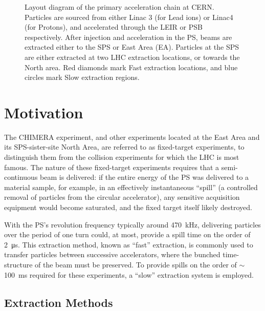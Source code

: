 \documentclass[11pt]{report}
\begin{document}
\begin{figure}
\caption{Layout diagram of the primary acceleration chain at CERN. Particles are sourced from either Linac 3 (for Lead ions) or Linac4 (for Protons), and accelerated through the LEIR or PSB respectively. After injection and acceleration in the PS, beams are extracted either to the SPS or East Area (EA). Particles at the SPS are either extracted at two LHC extraction locations, or towards the North area. Red diamonds mark Fast extraction locations, and blue circles mark Slow extraction regions.}
\label{fig:chain}
\end{figure}

\section{Motivation}

The CHIMERA experiment, and other experiments located at the East Area and its SPS-sister-site North Area, are referred to as fixed-target experiments, to distinguish them from the collision experiments for which the LHC is most famous. The nature of these fixed-target experiments requires that a semi-continuous beam is delivered: if the entire energy of the PS was delivered to a material sample, for example, in an effectively instantaneous ``spill'' (a controlled removal of particles from the circular accelerator), any sensitive acquisition equipment would become saturated, and the fixed target itself likely destroyed.

With the PS's revolution frequency typically around \qty{470}{kHz}, delivering particles over the period of one turn could, at most, provide a spill time on the order of \qty{2}{\micro\second}. This extraction method, known as ``fast'' extraction, is commonly used to transfer particles between successive accelerators, where the bunched time-structure of the beam must be preserved. To provide spills on the order of $\sim$\qty{100}{\ms} required for these experiments, a ``slow'' extraction system is employed.

\subsection{Extraction Methods}
\end{document}
